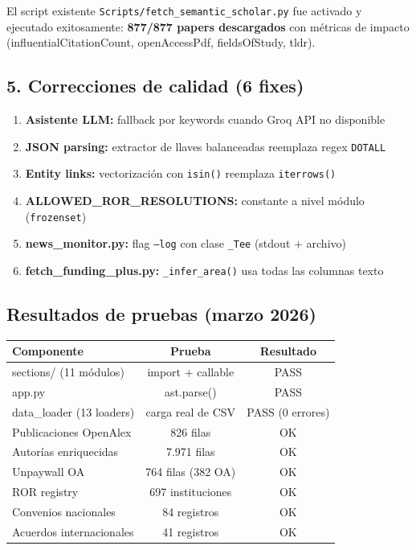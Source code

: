 \documentclass[12pt,a4paper]{report}
\begin{document}
El script existente \texttt{Scripts/fetch\_semantic\_scholar.py} fue activado y ejecutado
exitosamente: \textbf{877/877 papers descargados} con métricas de impacto (influentialCitationCount,
openAccessPdf, fieldsOfStudy, tldr).

\subsection*{5. Correcciones de calidad (6 fixes)}

\begin{enumerate}
  \item \textbf{Asistente LLM:} fallback por keywords cuando Groq API no disponible
  \item \textbf{JSON parsing:} extractor de llaves balanceadas reemplaza regex \texttt{DOTALL}
  \item \textbf{Entity links:} vectorización con \texttt{isin()} reemplaza \texttt{iterrows()}
  \item \textbf{ALLOWED\_ROR\_RESOLUTIONS:} constante a nivel módulo (\texttt{frozenset})
  \item \textbf{news\_monitor.py:} flag \texttt{--log} con clase \texttt{\_Tee} (stdout + archivo)
  \item \textbf{fetch\_funding\_plus.py:} \texttt{\_infer\_area()} usa todas las columnas texto
\end{enumerate}

\subsection*{Resultados de pruebas (marzo 2026)}

\begin{center}
\begin{tabular}{lcc}
\toprule
\textbf{Componente} & \textbf{Prueba} & \textbf{Resultado} \\
\midrule
sections/ (11 módulos) & import + callable & PASS \\
app.py & ast.parse() & PASS \\
data\_loader (13 loaders) & carga real de CSV & PASS (0 errores) \\
Publicaciones OpenAlex & 826 filas & OK \\
Autorías enriquecidas & 7.971 filas & OK \\
Unpaywall OA & 764 filas (382 OA) & OK \\
ROR registry & 697 instituciones & OK \\
Convenios nacionales & 84 registros & OK \\
Acuerdos internacionales & 41 registros & OK \\
\bottomrule
\end{tabular}
\end{center}
\end{document}
